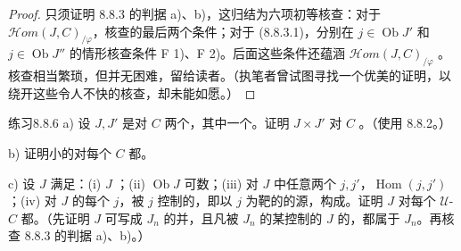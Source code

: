 \begin{proof}
只须证明 8.8.3 的判据 a)、b)，这归结为六项初等核查：对于 $\mathscr{H}\!om(J,C)_{/\varphi}$，核查的最后两个条件；对于 (8.8.3.1)，分别在 $j\in\operatorname{Ob}J'$ 和 $j\in\operatorname{Ob}J''$ 的情形核查条件 F 1)、F 2)。后面这些条件还蕴涵 $\mathscr{H}\!om(J,C)_{/\varphi}$ 。核查相当繁琐，但并无困难，留给读者。（执笔者曾试图寻找一个优美的证明，以绕开这些令人不快的核查，却未能如愿。）
\end{proof}
\begin{SGAresult}{练习}{8.8.6}
 a) 设 $J,J'$ 是对 $C$ 两个，其中一个。证明 $J\times J'$ 对 $C$ 。（使用 8.8.2。）

 b) 证明小的对每个 $C$ 都。

 c) 设 $J$ 满足：(i) $J$ ；(ii) $\operatorname{Ob}J$ 可数；(iii) 对 $J$ 中任意两个 $j,j'$，$\operatorname{Hom}(j,j')$ ；(iv) 对 $J$ 的每个 $j$，被 $j$ 控制的，即以 $j$ 为靶的的源，构成。证明 $J$ 对每个 $\mathcal U$- $C$ 都。（先证明 $J$ 可写成 $J_n$ 的并，且凡被 $J_n$ 的某控制的 $J$ 的，都属于 $J_n$。再核查 8.8.3 的判据 a)、b)。）
\end{SGAresult}
